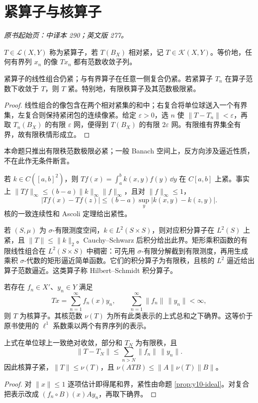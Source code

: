 \section{紧算子与核算子}\label{sec:yosida-10-02}
\noindent\textit{原书起始页：中译本 290；英文版 277。}

\begin{definition}[紧算子]
$T\in\mathcal L(X,Y)$ 称为紧算子，若 $T(B_X)$ 相对紧，记 $T\in\mathcal K(X,Y)$。等价地，任何有界列 $x_n$ 的像 $Tx_n$ 都有范数收敛子列。
\end{definition}

\begin{proposition}[闭理想性质]\label{prop:y10-ideal}
紧算子的线性组合仍紧；与有界算子在任意一侧复合仍紧。若紧算子 $T_n$ 在算子范数下收敛于 $T$，则 $T$ 紧。特别地，有限秩算子及其范数极限紧。
\end{proposition}
\begin{proof}
线性组合的像包含在两个相对紧集的和中；右复合将单位球送入一个有界集，左复合则保持紧闭包的连续像紧。给定 $\varepsilon>0$，选 $n$ 使 $\|T-T_n\|<\varepsilon$，再取 $T_n(B_X)$ 的有限 $\varepsilon$ 网，便得到 $T(B_X)$ 的有限 $2\varepsilon$ 网。有限维有界集全有界，故有限秩情形成立。
\end{proof}

本命题只推出有限秩范数极限必紧；一般 Banach 空间上，反方向涉及逼近性质，不在此作无条件断言。

\begin{example}[连续核与平方可积核]
若 $k\in C([a,b]^2)$，则 $Tf(x)=\int_a^b k(x,y)f(y)\,\dd y$ 在 $C[a,b]$ 上紧。事实上 $\|Tf\|_\infty\le(b-a)\|k\|_\infty\|f\|_\infty$，且对 $\|f\|_\infty\le1$，
\[
 |Tf(x)-Tf(z)|\le(b-a)\sup_y|k(x,y)-k(z,y)|.
\]
核的一致连续性和 Ascoli 定理给出紧性。

若 $(S,\mu)$ 为 $\sigma$-有限测度空间，$k\in L^2(S\times S)$，则对应积分算子在 $L^2(S)$ 上紧，且 $\|T\|\le\|k\|_2$。Cauchy--Schwarz 后积分给出此界。矩形乘积函数的有限线性组合在 $L^2(S\times S)$ 中稠密：可先用 $\sigma$-有限分解截到有限测度，再用生成乘积 $\sigma$-代数的矩形逼近简单函数。它们的积分算子为有限秩，且核的 $L^2$ 逼近给出算子范数逼近。这类算子称 Hilbert--Schmidt 积分算子。
\end{example}

\begin{definition}[核算子与核范数]\label{def:y10-nuclear}
若存在 $f_n\in X'$、$y_n\in Y$ 满足
\[
 Tx=\sum_{n=1}^\infty f_n(x)y_n,\qquad
 \sum_{n=1}^\infty\|f_n\|\,\|y_n\|<\infty,
\]
则 $T$ 为核算子。其核范数 $\nu(T)$ 为所有此类表示的上式总和之下确界。这等价于原书使用的 $\ell^1$ 系数乘以两个有界序列的表示。
\end{definition}
\begin{proposition}[核算子必紧]
上式在单位球上一致绝对收敛，部分和 $T_N$ 为有限秩，且
\[
 \|T-T_N\|\le\sum_{n>N}\|f_n\|\,\|y_n\|.
\]
因此核算子紧，$\|T\|\le\nu(T)$，且 $\nu(ATB)\le\|A\|\nu(T)\|B\|$。
\end{proposition}
\begin{proof}
对 $\|x\|\le1$ 逐项估计即得尾和界，紧性由命题 \ref{prop:y10-ideal}。对复合把表示改成 $(f_n\circ B)(x)Ay_n$，再取下确界。
\end{proof}

